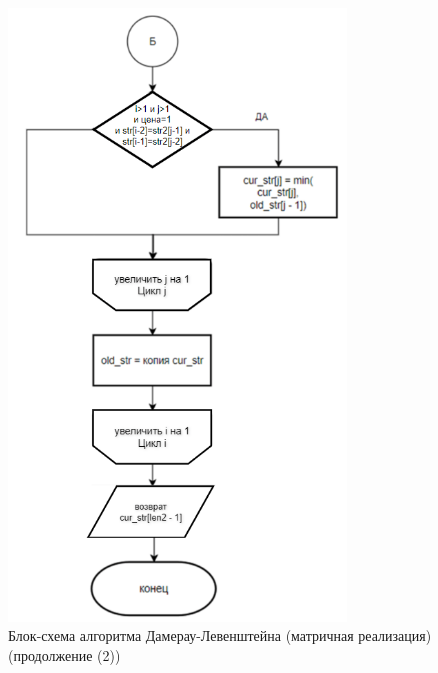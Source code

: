 \begin{figure}[H]
    \centering
    \includegraphics[width=0.8\textwidth]{img/block_2_1_3.png}
    \caption{Блок-схема алгоритма Дамерау-Левенштейна (матричная реализация)\\ (продолжение (2))}
    \label{fig:block_2_1_3}
\end{figure}

